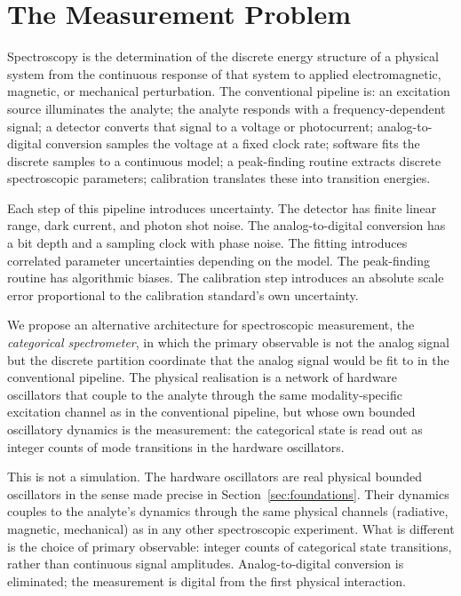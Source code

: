 \documentclass[11pt,a4paper]{article}
\theoremstyle{thmstyle}
\theoremstyle{axiomstyle}
\theoremstyle{definition}
\theoremstyle{remark}
\begin{document}
\section{The Measurement Problem}
\label{sec:intro}

Spectroscopy is the determination of the discrete energy structure of a physical system from the continuous response of that system to applied electromagnetic, magnetic, or mechanical perturbation. The conventional pipeline is: an excitation source illuminates the analyte; the analyte responds with a frequency-dependent signal; a detector converts that signal to a voltage or photocurrent; analog-to-digital conversion samples the voltage at a fixed clock rate; software fits the discrete samples to a continuous model; a peak-finding routine extracts discrete spectroscopic parameters; calibration translates these into transition energies.

Each step of this pipeline introduces uncertainty. The detector has finite linear range, dark current, and photon shot noise. The analog-to-digital conversion has a bit depth and a sampling clock with phase noise. The fitting introduces correlated parameter uncertainties depending on the model. The peak-finding routine has algorithmic biases. The calibration step introduces an absolute scale error proportional to the calibration standard's own uncertainty.

We propose an alternative architecture for spectroscopic measurement, the \emph{categorical spectrometer}, in which the primary observable is not the analog signal but the discrete partition coordinate that the analog signal would be fit to in the conventional pipeline. The physical realisation is a network of hardware oscillators that couple to the analyte through the same modality-specific excitation channel as in the conventional pipeline, but whose own bounded oscillatory dynamics is the measurement: the categorical state is read out as integer counts of mode transitions in the hardware oscillators.

This is not a simulation. The hardware oscillators are real physical bounded oscillators in the sense made precise in Section~\ref{sec:foundations}. Their dynamics couples to the analyte's dynamics through the same physical channels (radiative, magnetic, mechanical) as in any other spectroscopic experiment. What is different is the choice of primary observable: integer counts of categorical state transitions, rather than continuous signal amplitudes. Analog-to-digital conversion is eliminated; the measurement is digital from the first physical interaction.
\end{document}
